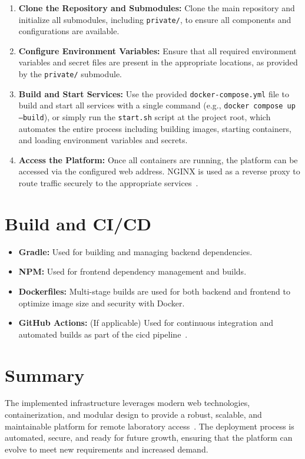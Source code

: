 \begin{enumerate}
    \item \textbf{Clone the Repository and Submodules:} Clone the main repository and initialize all submodules, including \texttt{private/}, to ensure all components and configurations are available.
    \item \textbf{Configure Environment Variables:} Ensure that all required environment variables and secret files are present in the appropriate locations, as provided by the \texttt{private/} submodule.
    \item \textbf{Build and Start Services:} Use the provided \texttt{docker-compose.yml} file to build and start all services with a single command (e.g., \texttt{docker compose up --build}), or simply run the \texttt{start.sh} script at the project root, which automates the entire process including building images, starting containers, and loading environment variables and secrets.
    \item \textbf{Access the Platform:} Once all containers are running, the platform can be accessed via the configured web address. NGINX is used as a reverse proxy to route traffic securely to the appropriate services~\cite{nginx-docs}.
\end{enumerate}

\section{Build and CI/CD} \label{sec:build_cicd}

\begin{itemize}
    \item \textbf{Gradle:} Used for building and managing backend dependencies.
    \item \textbf{NPM:} Used for frontend dependency management and builds.
    \item \textbf{Dockerfiles:} Multi-stage builds are used for both backend and frontend to optimize image size and security with Docker.
    \item \textbf{GitHub Actions:} (If applicable) Used for continuous integration and automated builds as part of the \ac{cicd} pipeline~\cite{github-actions-docs}.
\end{itemize}

\section{Summary}

The implemented infrastructure leverages modern web technologies, containerization, and modular design to provide a robust, scalable, and maintainable platform for remote laboratory access~\cite{nextjs-docs,docker-docs}. The deployment process is automated, secure, and ready for future growth, ensuring that the platform can evolve to meet new requirements and increased demand.